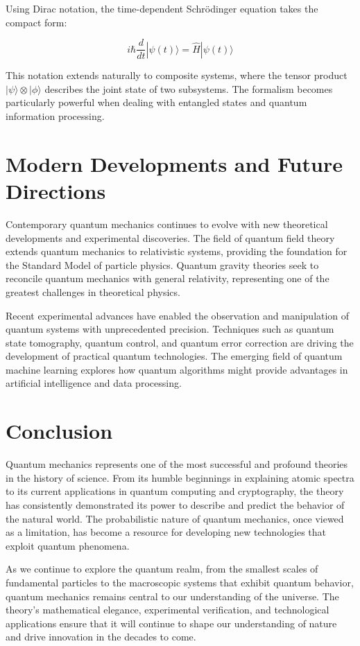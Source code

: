 \documentclass[11pt,a4paper]{article}
\begin{document}
Using Dirac notation, the time-dependent Schrödinger equation takes the compact form:

\begin{equation}
i\hbar \frac{d}{dt} |\psi(t)\rangle = \hat{H} |\psi(t)\rangle
\end{equation}

This notation extends naturally to composite systems, where the tensor product $|\psi\rangle \otimes |\phi\rangle$ describes the joint state of two subsystems. The formalism becomes particularly powerful when dealing with entangled states and quantum information processing.

\section{Modern Developments and Future Directions}

Contemporary quantum mechanics continues to evolve with new theoretical developments and experimental discoveries. The field of quantum field theory extends quantum mechanics to relativistic systems, providing the foundation for the Standard Model of particle physics. Quantum gravity theories seek to reconcile quantum mechanics with general relativity, representing one of the greatest challenges in theoretical physics.

Recent experimental advances have enabled the observation and manipulation of quantum systems with unprecedented precision. Techniques such as quantum state tomography, quantum control, and quantum error correction are driving the development of practical quantum technologies. The emerging field of quantum machine learning explores how quantum algorithms might provide advantages in artificial intelligence and data processing.

\section{Conclusion}

Quantum mechanics represents one of the most successful and profound theories in the history of science. From its humble beginnings in explaining atomic spectra to its current applications in quantum computing and cryptography, the theory has consistently demonstrated its power to describe and predict the behavior of the natural world. The probabilistic nature of quantum mechanics, once viewed as a limitation, has become a resource for developing new technologies that exploit quantum phenomena.

As we continue to explore the quantum realm, from the smallest scales of fundamental particles to the macroscopic systems that exhibit quantum behavior, quantum mechanics remains central to our understanding of the universe. The theory's mathematical elegance, experimental verification, and technological applications ensure that it will continue to shape our understanding of nature and drive innovation in the decades to come.



\end{document}
